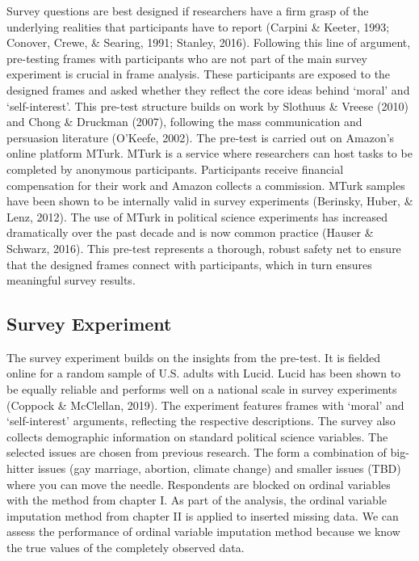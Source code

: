 \documentclass[12pt,econ]{sources/authesis}
\begin{document}
Survey questions are best designed if researchers have a firm grasp of the underlying realities that participants have to report (Carpini \& Keeter, 1993; Conover, Crewe, \& Searing, 1991; Stanley, 2016). Following this line of argument, pre-testing frames with participants who are not part of the main survey experiment is crucial in frame analysis. These participants are exposed to the designed frames and asked whether they reflect the core ideas behind `moral' and `self-interest'. This pre-test structure builds on work by Slothuus \& Vreese (2010) and Chong \& Druckman (2007), following the mass communication and persuasion literature (O'Keefe, 2002). The pre-test is carried out on Amazon's online platform MTurk. MTurk is a service where researchers can host tasks to be completed by anonymous participants. Participants receive financial compensation for their work and Amazon collects a commission. MTurk samples have been shown to be internally valid in survey experiments (Berinsky, Huber, \& Lenz, 2012). The use of MTurk in political science experiments has increased dramatically over the past decade and is now common practice (Hauser \& Schwarz, 2016). This pre-test represents a thorough, robust safety net to ensure that the designed frames connect with participants, which in turn ensures meaningful survey results.

\hypertarget{framing-data-survey}{%
\subsection{Survey Experiment}\label{framing-data-survey}}

The survey experiment builds on the insights from the pre-test. It is fielded online for a random sample of U.S. adults with Lucid. Lucid has been shown to be equally reliable and performs well on a national scale in survey experiments (Coppock \& McClellan, 2019).
The experiment features frames with `moral' and `self-interest' arguments, reflecting the respective descriptions.
The survey also collects demographic information on standard political science variables.
The selected issues are chosen from previous research. The form a combination of big-hitter issues (gay marriage, abortion, climate change) and smaller issues (TBD) where you can move the needle.
Respondents are blocked on ordinal variables with the method from chapter I. As part of the analysis, the ordinal variable imputation method from chapter II is applied to inserted missing data. We can assess the performance of ordinal variable imputation method because we know the true values of the completely observed data.
\end{document}
